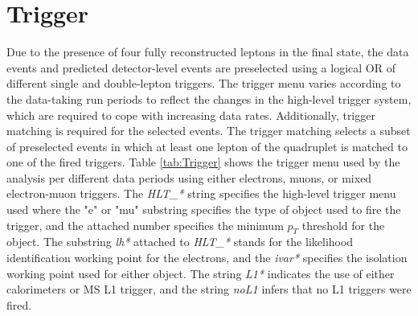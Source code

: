 \section{Trigger}
\label{sec:Trigger}

Due to the presence of four fully reconstructed leptons in the final state, the data events and predicted detector-level events are preselected using a logical OR of different single and double-lepton triggers. The trigger menu varies according to the data-taking run periods to reflect the changes in the high-level trigger system, which are required to cope with increasing data rates. Additionally, trigger matching is required for the selected events. The trigger matching selects a subset of preselected events in which at least one lepton of the quadruplet is matched to one of the fired triggers. Table \ref{tab:Trigger} shows the trigger menu used by the analysis per different data periods using either electrons, muons, or mixed electron-muon triggers. The \textit{HLT\_*} string specifies the high-level trigger menu used where the "e" or "mu" substring specifies the type of object used to fire the trigger, and the attached number specifies the minimum $p_{T}$ threshold for the object. The substring \textit{lh*} attached to \textit{HLT\_*} stands for the likelihood identification working point for the electrons, and the \textit{ivar*} specifies the isolation working point used for either object. The string \textit{L1*} indicates the use of either calorimeters or MS L1 trigger, and the string \textit{noL1} infers that no L1 triggers were fired. 

